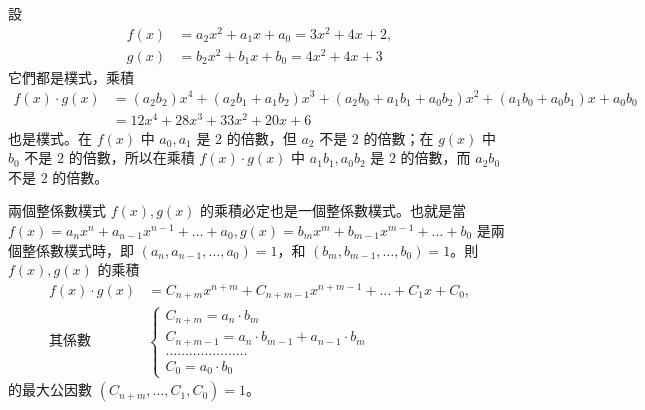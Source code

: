 \begin{example}\label{ex:7-2-13}
設
\begin{align*}
  f(x) &= a_2 x^2+a_1 x+a_0 = 3x^2+4x+2, \\
  g(x) &= b_2 x^2+b_1 x+b_0 = 4x^2+4x+3
\end{align*}
它們都是樸式，乘積
\begin{align*}
  f(x) \cdot g(x) &= (a_2 b_2)x^4+(a_2 b_1+a_1 b_2)x^3+(a_2 b_0+a_1 b_1+a_0 b_2)x^2+(a_1 b_0+a_0 b_1)x+a_0 b_0 \\
  &= 12x^4+28x^3+33x^2+20x+6
\end{align*}
也是樸式。在 $f(x)$ 中 $a_0, a_1$ 是 $2$ 的倍數，但 $a_2$ 不是 $2$ 的倍數；在 $g(x)$ 中 $b_0$ 不是 $2$ 的倍數，所以在乘積 $f(x) \cdot g(x)$ 中 $a_1 b_1, a_0 b_2$ 是 $2$ 的倍數，而 $a_2 b_0$ 不是 $2$ 的倍數。
\end{example}

\begin{lemma}[高斯引理]\label{lem:gauss}
兩個整係數樸式 $f(x), g(x)$ 的乘積必定也是一個整係數樸式。也就是當 $f(x) = a_n x^n + a_{n-1} x^{n-1} + \dots + a_0, g(x) = b_m x^m + b_{m-1} x^{m-1} + \dots + b_0$ 是兩個整係數樸式時，即 $(a_n, a_{n-1}, \dots, a_0) = 1$，和 $(b_m, b_{m-1}, \dots, b_0) = 1$。則 $f(x), g(x)$ 的乘積
\begin{align*}
  f(x) \cdot g(x) &= C_{n+m} x^{n+m} + C_{n+m-1} x^{n+m-1} + \dots + C_1 x + C_0, \\
  \text{其係數} \quad &\begin{cases}
    C_{n+m} = a_n \cdot b_m \\
    C_{n+m-1} = a_n \cdot b_{m-1} + a_{n-1} \cdot b_m \\
    \dots\dots\dots\dots\dots\dots\dots \\
    C_0 = a_0 \cdot b_0
  \end{cases}
\end{align*}
的最大公因數 $(C_{n+m}, \dots, C_1, C_0) = 1$。
\end{lemma}

